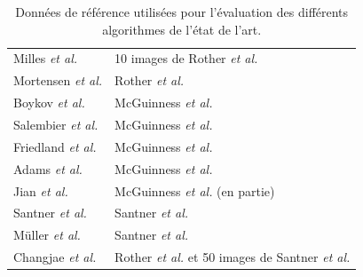 \begin{emodif}
 
\begin{table}[htb]
\caption{Données de référence utilisées pour l'évaluation des différents algorithmes de l'état de l'art.}
\centering
\begin{tabular}{|l|l|}
\hline
\cellcolor{gris}{Algorithme} & \cellcolor{gris}{Données de références}\\
\hline
Milles \textit{et al.} \cite{mille2015combination} & 10 images de Rother \textit{et al.} \cite{rother2004grabcut}\\
\hline 
Mortensen \textit{et al.} \cite{mortensen1995intelligent}& Rother \textit{et al.} \cite{rother2004grabcut} \\
\hline
Boykov \textit{et al.}  \cite{boykov2001interactive}&  McGuinness \textit{et al.} \cite{mcguinness2010comparative}\\ 
\hline
Salembier \textit{et al.} \cite{salembier2000binary}&  McGuinness \textit{et al.} \cite{mcguinness2010comparative}\\
\hline
Friedland \textit{et al.} \cite{friedland2005siox} &  McGuinness \textit{et al.} \cite{mcguinness2010comparative}\\
\hline
Adams \textit{et al.} \cite{adams1994seeded} &  McGuinness \textit{et al.} \cite{mcguinness2010comparative}\\ 
\hline
Jian \textit{et al.} \cite{jian2016interactive} &  McGuinness \textit{et al.} \cite{mcguinness2010comparative} (en partie) \\
\hline
Santner \textit{et al.} \cite{santner2010interactive}& Santner \textit{et al.} \cite{santner2010interactive} \\
\hline
Müller \textit{et al.} \cite{muller2016robust}& Santner \textit{et al.} \cite{santner2010interactive}\\
\hline
 Changjae \textit{et al.} \cite{Changjae2017Robust} & Rother \textit{et al.} \cite{rother2004grabcut} et 50 images de Santner \textit{et al.} \cite{santner2010interactive}\\
\hline
\end{tabular}
\label{tab:eval:donnerefparalgo}
\end{table}


\end{emodif}

